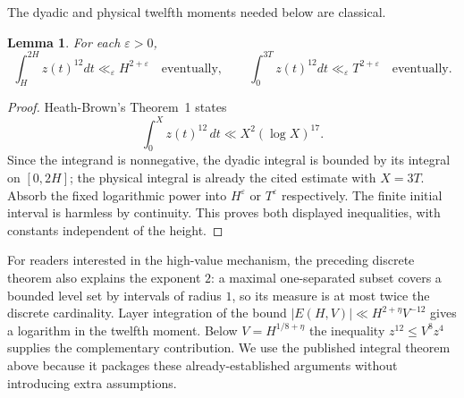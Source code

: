 \documentclass[11pt,a4paper,oneside]{article}
\newtheorem{lemma}[theorem]{Lemma}
\theoremstyle{definition}
\newcommand{\eps}{\varepsilon}
\numberwithin{equation}{section}
\begin{document}
The dyadic and physical twelfth moments needed below are classical.
\begin{lemma}\label{lem:twelfth}
For each $\eps>0$,
\[
 \int_H^{2H}z(t)^{12}dt\ll_\eps H^{2+\eps}
 \quad\text{eventually},\qquad
 \int_0^{3T}z(t)^{12}dt\ll_\eps T^{2+\eps}
 \quad\text{eventually}.
\]
\end{lemma}
\begin{proof}
Heath-Brown's Theorem~1 \cite{HeathBrownMoment} states
\[
 \int_0^X z(t)^{12}\,dt\ll X^2(\log X)^{17}.
\]
Since the integrand is nonnegative, the dyadic integral is bounded by its integral on $[0,2H]$; the physical integral is already the cited estimate with $X=3T$. Absorb the fixed logarithmic power into $H^\eps$ or $T^\eps$ respectively. The finite initial interval is harmless by continuity. This proves both displayed inequalities, with constants independent of the height.
\end{proof}
For readers interested in the high-value mechanism, the preceding discrete theorem also explains the exponent $2$: a maximal one-separated subset covers a bounded level set by intervals of radius $1$, so its measure is at most twice the discrete cardinality. Layer integration of the bound $|E(H,V)|\ll H^{2+\eta}V^{-12}$ gives a logarithm in the twelfth moment. Below $V=H^{1/8+\eta}$ the inequality $z^{12}\le V^8z^4$ supplies the complementary contribution. We use the published integral theorem above because it packages these already-established arguments without introducing extra assumptions.
\end{document}
